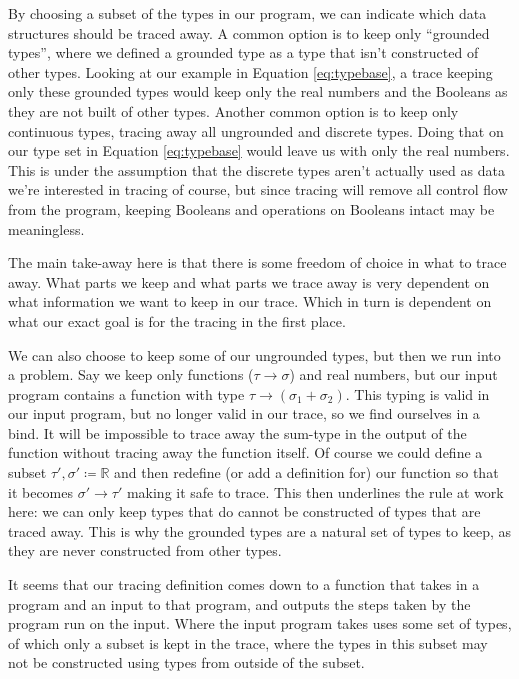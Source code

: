     By choosing a subset of the types in our program, we can indicate which data structures should be traced away.
    A common option is to keep only ``grounded types'', where we defined a grounded type as a type that isn't constructed of other types.
    Looking at our example in Equation \ref{eq:typebase}, a trace keeping only these grounded types would keep only the real numbers and the Booleans as they are not built of other types.
    Another common option is to keep only continuous types, tracing away all ungrounded and discrete types.
    Doing that on our type set in Equation \ref{eq:typebase} would leave us with only the real numbers.
    This is under the assumption that the discrete types aren't actually used as data we're interested in tracing of course, but since tracing will remove all control flow from the program, keeping Booleans and operations on Booleans intact may be meaningless. 

    The main take-away here is that there is some freedom of choice in what to trace away.
    What parts we keep and what parts we trace away is very dependent on what information we want to keep in our trace.
    Which in turn is dependent on what our exact goal is for the tracing in the first place.
    
    We can also choose to keep some of our ungrounded types, but then we run into a problem.
    Say we keep only functions ($\tau\to\sigma$) and real numbers, but our input program contains a function with type $\tau\to(\sigma_1+\sigma_2)$.
    This typing is valid in our input program, but no longer valid in our trace, so we find ourselves in a bind.
    It will be impossible to trace away the sum-type in the output of the function without tracing away the function itself.
    Of course we could define a subset $\tau',\sigma'\coloneqq\mathbb{R}$ and then redefine (or add a definition for) our function so that it becomes $\sigma'\to\tau'$ making it safe to trace.
    This then underlines the rule at work here: we can only keep types that do cannot be constructed of types that are traced away.
    This is why the grounded types are a natural set of types to keep, as they are never constructed from other types.

    It seems that our tracing definition comes down to a function that takes in a program and an input to that program, and outputs the steps taken by the program run on the input.
    Where the input program takes uses some set of types, of which only a subset is kept in the trace, where the types in this subset may not be constructed using types from outside of the subset.

